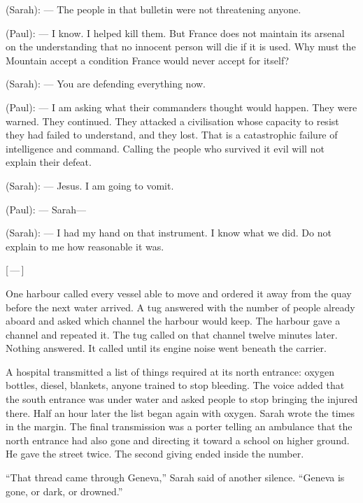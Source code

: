 \begin{room}
(Sarah): --- The people in that bulletin were not threatening anyone.

(Paul): --- I know. I helped kill them. But France does not maintain its arsenal on the understanding that no innocent person will die if it is used. Why must the Mountain accept a condition France would never accept for itself?

(Sarah): --- You are defending everything now.

(Paul): --- I am asking what their commanders thought would happen. They were warned. They continued. They attacked a civilisation whose capacity to resist they had failed to understand, and they lost. That is a catastrophic failure of intelligence and command. Calling the people who survived it evil will not explain their defeat.

(Sarah): --- Jesus. I am going to vomit.

(Paul): --- Sarah---

(Sarah): --- I had my hand on that instrument. I know what we did. Do not explain to me how reasonable it was.

\centerline{[\,---\,]}

\end{room}

One harbour called every vessel able to move and ordered it away from the quay before the next water arrived. A tug answered with the number of people already aboard and asked which channel the harbour would keep. The harbour gave a channel and repeated it. The tug called on that channel twelve minutes later. Nothing answered. It called until its engine noise went beneath the carrier.\par

A hospital transmitted a list of things required at its north entrance: oxygen bottles, diesel, blankets, anyone trained to stop bleeding. The voice added that the south entrance was under water and asked people to stop bringing the injured there. Half an hour later the list began again with oxygen. Sarah wrote the times in the margin. The final transmission was a porter telling an ambulance that the north entrance had also gone and directing it toward a school on higher ground. He gave the street twice. The second giving ended inside the number.\par

``That thread came through Geneva,'' Sarah said of another silence. ``Geneva is gone, or dark, or drowned.''\par

